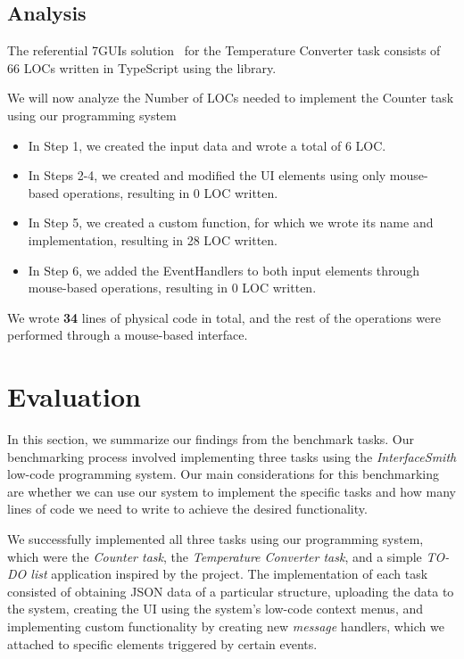 \medskip
\subsection{Analysis}
The referential 7GUIs solution~\cite{7guis-React-TypeScript-MobX/src/app/guis/tempconv.tsx} for the Temperature Converter task consists of 66 LOCs written in TypeScript using the \citet{react} library.

We will now analyze the Number of LOCs needed to implement the Counter task using our programming system
\begin{itemize}
	\item In Step 1, we created the input data and wrote a total of 6 LOC.
	\item   In Steps 2-4, we created and modified the UI elements using only mouse-based operations, resulting in 0 LOC written.
	\item   In Step 5, we created a custom function, for which we wrote its name and implementation, resulting in 28 LOC written.
	\item   In Step 6, we added the EventHandlers to both input elements through mouse-based operations, resulting in 0 LOC written.
\end{itemize}
\noindent We wrote \textbf{34} lines of physical code in total, and the rest of the operations were performed through a mouse-based interface.



\clearpage
\section{Evaluation}
In this section, we summarize our findings from the benchmark tasks.
Our benchmarking process involved implementing three tasks using the \emph{InterfaceSmith} low-code programming system.
Our main considerations for this benchmarking are whether we can use our system to implement the specific tasks and how many lines of code we need to write to achieve the desired functionality.

We successfully implemented all three tasks using our programming system, which were the \emph{Counter task}\cite{7GUIs-web},
the \emph{Temperature Converter task}\cite{7GUIs-web}, and a simple \emph{TO-DO list} application inspired by the \citet{TodoMVC} project.
The implementation of each task consisted of obtaining JSON data of a particular structure, uploading the data to the system, creating the UI using the system's low-code context menus, and implementing custom functionality by
creating new \emph{message} handlers, which we attached to specific elements triggered by certain events.

